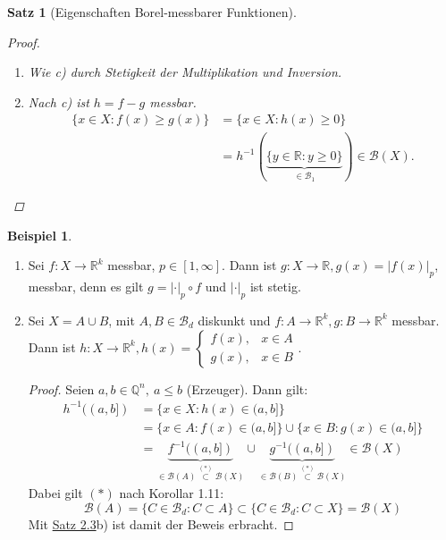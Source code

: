 \documentclass[a4paper]{scrreprt}
\newcommand{\R}{\mathbb{R}}
\newcommand{\Q}{\mathbb{Q}}
\newcommand{\Borel}{\mathcal{B}}
\newcommand{\Bd}{\Borel_d}
\newcommand{\jhyperref}[2]{\hyperref[j_#1]{#2}}
\newcommand{\jlink}[1]{\jhyperref{#1}{#1}}
\newcommand{\jabb}[3]{ #1: #2 \rightarrow #3 }
\theoremstyle{plain}
\newtheorem{satz}[thm]{Satz}
\theoremstyle{definition}
\newtheorem*{expl*}{Beispiel}
\begin{document}
{{{\begin{satz}[Eigenschaften Borel-messbarer Funktionen]
\begin{proof}
\begin{enumerate}
            \item Wie c) durch Stetigkeit der Multiplikation und Inversion.
            
            \item 
                Nach c) ist $h=f-g$ messbar.
                \begin{displaymath}
                    \begin{split}
                        \{x\in X : f(x) \ge g(x)\} &= \{x\in X: h(x) \ge 0\} \\
                        &= h^{-1}(\underbrace{\{y \in \R : y \ge 0\}}_{\in \Borel_1}) \in \Borel(X).
                    \end{split}
                \end{displaymath}
        \end{enumerate}
    \end{proof}
\end{satz}

\begin{expl*}
    \begin{enumerate}
        \item
            Sei $\jabb{f}{X}{\R^k}$ messbar, $p\in [1,\infty]$. Dann ist $\jabb{g}{X}{\R}, g(x) = |f(x)|_p$, messbar, denn es gilt $g = |\cdot|_p \circ f$ und $|\cdot|_p$ ist stetig.
        \item
            Sei $X = A\cup B$, mit $A,B\in \Bd$ diskunkt und $\jabb{f}{A}{\R^k}, \jabb{g}{B}{\R^k}$ messbar. Dann ist $\jabb{h}{X}{\R^k}, h(x) = \begin{cases} f(x), & x\in A\\ g(x), & x\in B \end{cases}$.
            \begin{proof}
                Seien $a,b \in \Q^n,\ a\le b$ (Erzeuger). Dann gilt:
                \begin{displaymath}
                    \begin{split}
                    h^{-1}((a,b]) &= \{x\in X : h(x) \in (a,b]\} \\
                                  &= \{x\in A: f(x) \in (a,b]\} \cup \{x\in B : g(x) \in (a,b]\}\\
                                  &= \underbrace{f^{-1}((a,b])}_{\in \Borel(A) \overset{(*)}{\subset} \Borel(X)} \cup \underbrace{g^{-1}((a,b])}_{\in \Borel(B) \overset{(*)}{\subset} \Borel(X)} \in \Borel(X)
                    \end{split}
                \end{displaymath}
                Dabei gilt $(*)$ nach Korollar 1.11:
                \begin{displaymath}
                    \Borel(A) = \{C\in \Bd : C\subset A\} \subset \{C \in \Bd : C\subset X\} = \Borel(X)
                \end{displaymath}
                Mit \jlink{Satz 2.3}b) ist damit der Beweis erbracht.
            \end{proof}
    \end{enumerate}
\end{expl*}

}}}
\end{document}

